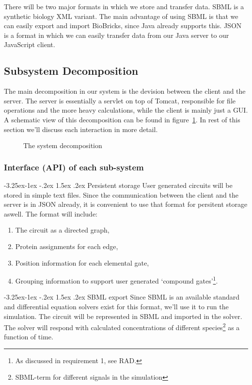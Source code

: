 \documentclass[a4paper]{article}
\makeatletter
\renewcommand\paragraph{\@startsection{paragraph}{4}{\z@}%
  {-3.25ex\@plus -1ex \@minus -.2ex}%
  {1.5ex \@plus .2ex}%
  {\normalfont\normalsize\bfseries}}
\makeatother
\begin{document}
There will be two major formats in which we store and transfer data. SBML is a synthetic biology XML variant. The main advantage of using SBML is that we can easily export and import BioBricks, since Java already supports this. JSON is a format in which we can easily transfer data from our Java server to our JavaScript client. 

\subsection{Subsystem Decomposition}
The main decomposition in our system is the devision between the client and the server. The server is essentially a servlet on top of Tomcat, responsible for file operations and the more heavy calculations, while the client is mainly just a GUI. A schematic view of this decomposition can be found in figure~\ref{fig-decomposition}. In rest of this section we'll discuss each interaction in more detail.

\begin{figure}[h!]
	\caption{The system decomposition}
	\label{fig-decomposition}
	\centering
\end{figure}

\pagebreak

\subsubsection{Interface (API) of each sub-system}

\paragraph{Persistent storage}
User generated circuits will be stored in simple text files. Since the communication between the client and the server is in JSON already, it is convenient to use that format for persitent storage aswell. The format will include:
\begin{enumerate}[-]
	\item The circuit as a directed graph,
	\item Protein assignments for each edge,
	\item Position information for each elemental gate,
	\item Grouping information to support user generated `compound gates'\footnote{As discussed in requirement 1, see RAD.}.
\end{enumerate}

\paragraph{SBML export}
Since SBML is an available standard and differential equation solvers exist for this format, we'll use it to run the simulation. The circuit will be represented in SBML and imported in the solver. The solver will respond with calculated concentrations of different species\footnote{SBML-term for different signals in the simulation} as a function of time.
\end{document}
